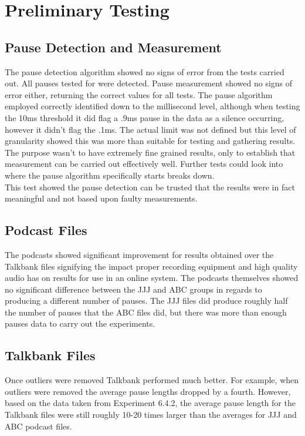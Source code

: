 \section{Preliminary Testing}
\subsection{Pause Detection and Measurement}
The pause detection algorithm showed no signs of error from the tests carried out. All pauses tested for were detected. Pause measurement showed no signs of error either, returning the correct values for all tests. The pause algorithm employed correctly identified down to the millisecond level, although when testing the 10ms threshold it did flag a .9ms pause in the data as a silence occurring, however it didn't flag the .1ms. The actual limit was not defined but this level of granularity showed this was more than suitable for testing and gathering results. The purpose wasn't to have extremely fine grained results, only to establish that measurement can be carried out effectively well. Further tests could look into where the pause algorithm specifically starts breaks down. \\

This test showed the pause detection can be trusted that the results were in fact meaningful and not based upon faulty measurements.

\subsection{Podcast Files}
The podcasts showed significant improvement for results obtained over the Talkbank files signifying the impact proper recording equipment and high quality audio has on results for use in an online system. The podcasts themselves showed no significant difference between the JJJ and ABC groups in regards to producing a different number of pauses. The JJJ files did produce roughly half the number of pauses that the ABC files did, but there was more than enough pauses data to carry out the experiments. \\

\subsection{Talkbank Files} 
Once outliers were removed Talkbank performed much better. For example, when outliers were removed the average pause lengths dropped by a fourth. However, based on the data taken from Experiment 6.4.2, the average pause length for the Talkbank files were still roughly 10-20 times larger than the averages for JJJ and ABC podcast files. \\ 

